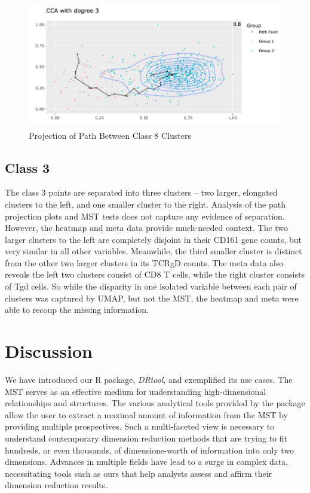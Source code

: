 \documentclass{article}
\begin{document}
{\renewcommand{\figurename}{Figure}
\renewcommand{\thefigure}{8}
\begin{figure}[!t]
\centering
\includegraphics[scale=0.47]{class 8 projection Wong}
\caption{Projection of Path Between Class 8 Clusters}
\end{figure}

\subsection{Class 3}
The class 3 points are separated into three clusters -- two larger, elongated clusters to the left, and one smaller cluster to the right. Analysis of the path projection plots and MST tests does not capture any evidence of separation. However, the heatmap and meta data provide much-needed context. The two larger clusters to the left are completely disjoint in their CD161 gene counts, but very similar in all other variables. Meanwhile, the third smaller cluster is distinct from the other two larger clusters in its TCRgD counts. The meta data also reveals the left two clusters consist of CD8 T cells, while the right cluster consists of Tgd cells. So while the disparity in one isolated variable between each pair of clusters was captured by UMAP, but not the MST, the heatmap and meta were able to recoup the missing information.
\section{Discussion}
We have introduced our R package, \textit{DRtool}, and exemplified its use cases. The MST serves as an effective medium for understanding high-dimensional relationships and structures. The various analytical tools provided by the package allow the user to extract a maximal amount of information from the MST by providing multiple prospectives. Such a multi-faceted view is necessary to understand contemporary dimension reduction methods that are trying to fit hundreds, or even thousands, of dimensions-worth of information into only two dimensions. Advances in multiple fields have lead to a surge in complex data, necessitating tools such as ours that help analysts assess and affirm their dimension reduction results.

}
\end{document}
